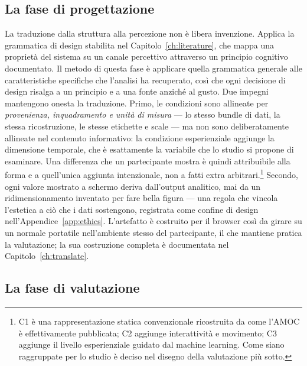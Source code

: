 \subsection{La fase di progettazione}
\label{subsec:design}

La traduzione dalla struttura alla percezione non è libera invenzione. Applica la grammatica di design stabilita nel Capitolo~\ref{ch:literature}, che mappa una proprietà del sistema su un canale percettivo attraverso un principio cognitivo documentato. Il metodo di questa fase è applicare quella grammatica generale alle caratteristiche specifiche che l'analisi ha recuperato, così che ogni decisione di design risalga a un principio e a una fonte anziché al gusto. Due impegni mantengono onesta la traduzione. Primo, le condizioni sono allineate per \emph{provenienza, inquadramento e unità di misura} --- lo stesso bundle di dati, la stessa ricostruzione, le stesse etichette e scale --- ma non sono deliberatamente allineate nel contenuto informativo: la condizione esperienziale aggiunge la dimensione temporale, che è esattamente la variabile che lo studio si propone di esaminare. Una differenza che un partecipante mostra è quindi attribuibile alla forma e a quell'unica aggiunta intenzionale, non a fatti extra arbitrari.\footnote{C1 è una rappresentazione statica convenzionale ricostruita da come l'AMOC è effettivamente pubblicata; C2 aggiunge interattività e movimento; C3 aggiunge il livello esperienziale guidato dal machine learning. Come siano raggruppate per lo studio è deciso nel disegno della valutazione più sotto.} Secondo, ogni valore mostrato a schermo deriva dall'output analitico, mai da un ridimensionamento inventato per fare bella figura --- una regola che vincola l'estetica a ciò che i dati sostengono, registrata come confine di design nell'Appendice~\ref{app:ethics}. L'artefatto è costruito per il browser così da girare su un normale portatile nell'ambiente stesso del partecipante, il che mantiene pratica la valutazione; la sua costruzione completa è documentata nel Capitolo~\ref{ch:translate}.

\subsection{La fase di valutazione}
\label{subsec:evaluation}

